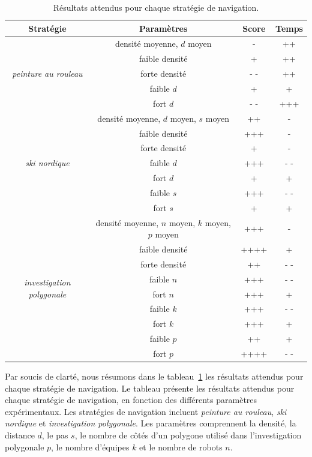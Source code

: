 \documentclass[francais,RandD]{rapportPFE}
\begin{document}
		\begin{table}[h!]
			\centering
			\begin{tabular}{|c|c|c|c|}
				\hline
				Stratégie & Paramètres & Score & Temps \\
				\hline
				\multirow{5}{*}{\textit{peinture au rouleau}} & densité moyenne, $d$ moyen & - & ++ \\
				\cline{2-4}
				& faible densité & + & ++ \\
				& forte densité & - - & ++ \\
				& faible $d$ & + & + \\
				& fort $d$ & - - & +++ \\
				\hline
				\multirow{7}{*}{\textit{ski nordique}} & densité moyenne, $d$ moyen, $s$ moyen & ++ & - \\
				\cline{2-4}
				& faible densité & +++ & - \\
				& forte densité & + & - \\
				& faible $d$ & +++ & - - \\
				& fort $d$ & + & + \\
				& faible $s$ & +++ & - - \\
				& fort $s$ & + & + \\
				\hline
				\multirow{9}{*}{\textit{investigation polygonale}} & densité moyenne, $n$ moyen, $k$ moyen, $p$ moyen & +++ & - \\
				\cline{2-4}
				& faible densité & ++++ & + \\
				& forte densité & ++ & - - \\
				& faible $n$ & +++ & - - \\
				& fort $n$ & +++ & + \\
				& faible $k$ & +++ & - - \\
				& fort $k$ & +++ & + \\
				& faible $p$ & ++ & + \\
				& fort $p$ & ++++ & - - \\
				\hline
			\end{tabular}
			\caption{Résultats attendus pour chaque stratégie de navigation.}
			\label{tab:expected_results}
		\end{table}

		Par soucis de clarté, nous résumons dans le tableau~\ref{tab:expected_results} les résultats attendus pour chaque stratégie de navigation.
		Le tableau présente les résultats attendus pour chaque stratégie de navigation, en fonction des différents paramètres expérimentaux.
		Les stratégies de navigation incluent \textit{peinture au rouleau}, \textit{ski nordique} et \textit{investigation polygonale}.
		Les paramètres comprennent la densité, la distance $d$, le pas $s$, le nombre de côtés d'un polygone utilisé dans l'investigation polygonale $p$, le nombre d'équipes $k$ et le nombre de robots $n$.
\end{document}
